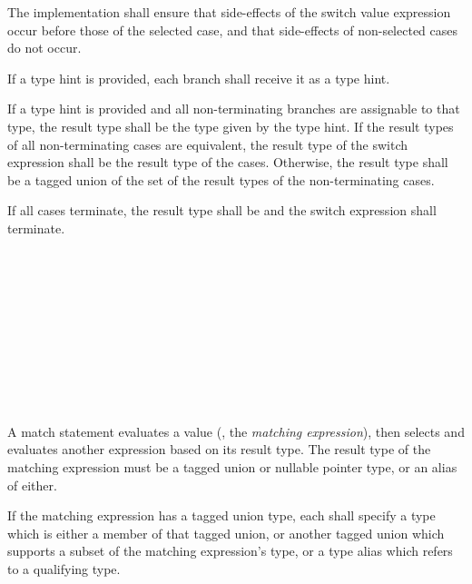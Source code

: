 \specsubsubitem
The implementation shall ensure that side-effects of the switch value
expression occur before those of the selected case, and that side-effects of
non-selected cases do not occur.

\specsubsubitem
If a type hint is provided, each branch shall receive it as a type hint.

\specsubsubitem
If a type hint is provided and all non-terminating branches are assignable to
that type, the result type shall be the type given by the type hint. If the
result types of all non-terminating cases are equivalent, the result type of
the switch expression shall be the result type of the cases. Otherwise, the
result type shall be a tagged union of the set of the result types of the
non-terminating cases.

If all cases terminate, the result type shall be  and the switch
expression shall terminate.


\begin{grammar}
 \\
	 \terminal{(}  \terminal{)} \terminal{\{}  \terminal{\}} \\

 \\
	 \optional{\terminal{,}} \\
	 \terminal{,}  \\

 \\
	 \terminal{:}  \terminal{=>}  \\
	 \terminal{=>}  \\
	\terminal{*} \terminal{=>}  \\
\end{grammar}

\specsubsubitem
A match statement evaluates a value (, the
\textit{matching expression}), then selects and evaluates another expression
based on its result type. The result type of the matching expression must be a
tagged union or nullable pointer type, or an alias of either.

\specsubsubitem
If the matching expression has a tagged union type, each
 shall specify a type which is either a member of that
tagged union, or another tagged union which supports a subset of the matching
expression's type, or a type alias which refers to a qualifying type.

